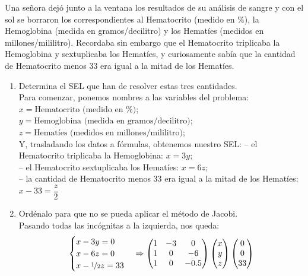 \documentclass[12pt]{article}
\begin{document}
	\begin{ejercicio}
		Una señora dejó junto a la ventana los resultados de su análisis de sangre y con el sol se borraron los correspondientes al Hematocrito (medido en \%), la Hemoglobina (medida en gramos/decilitro) y los Hematíes (medidos en millones/mililitro). Recordaba sin embargo que el Hematocrito triplicaba la Hemoglobina y sextuplicaba los Hematíes, y curiosamente sabía que la cantidad de Hematocrito menos 33 era igual a la mitad de los Hematíes.
		
		\begin{enumerate}[label=\alph*)] 
			\item Determina el SEL que han de resolver estas tres cantidades. \\
			
				Para comenzar, ponemos nombres a las variables del problema: \\
				$x = \text{Hematocrito (medido en \%)}$; \\
				$y = \text{Hemoglobina (medida en gramos/decilitro)}$; \\
				$z = \text{Hematíes (medidos en millones/mililitro)}$; \\
				
				Y, trasladando los datos a fórmulas, obtenemos nuestro SEL:  
				– el Hematocrito triplicaba la Hemoglobina: $x = 3y$; \\
				– el Hematocrito sextuplicaba los Hematíes: $x = 6z$; \\
				– la cantidad de Hematocrito menos 33 era igual a la mitad de los Hematíes: $x - 33 = \dfrac{z}{2}$ \\
					
			\item Ordénalo para que no se pueda aplicar el método de Jacobi. \\
			
				Pasando todas las incógnitas a la izquierda, nos queda:
				$$ \begin{cases}
					x - 3y = 0 \\
					x - 6z = 0 \\
					x - \nicefrac{1}{2} z = 33
				\end{cases} \Rightarrow
				\begin{pmatrix}
					1 & -3 & 0 \\
					1 & 0 & -6 \\
					1 & 0 & -0.5
				\end{pmatrix} 
				\begin{pmatrix}
					x \\
					y \\
					z
				\end{pmatrix}
				\begin{pmatrix}
					0 \\
					0 \\
					33
				\end{pmatrix}$$
				

\end{enumerate}
\end{ejercicio}
\end{document}
